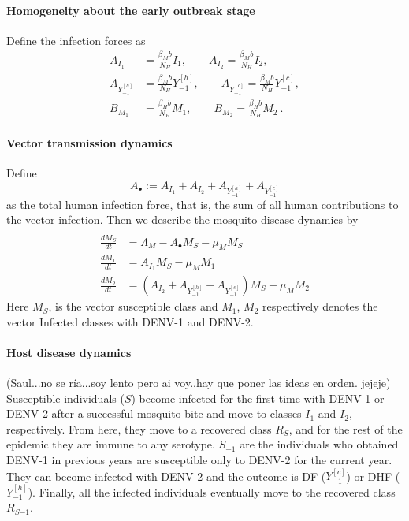 
\paragraph{Homogeneity about the early outbreak stage}

Define the infection forces as
\begin{equation}
	\begin{aligned}
		A_{I_1} &=
			\frac{\beta_Mb}{N_H} I_1, \qquad
		A_{I_2}=
			\frac{\beta_Mb}{N_H} I_2,
	\\
		A_{Y_{-1}^{[h]}}&=
		\frac{\beta_Mb}{N_H} Y_{-1} ^{[h]}, \qquad
		A_{Y_{-1}^{[c]}}=
			\frac{\beta_Mb}{N_H} Y_{-1}^{[c]},
	\\
		B_{M_1} &= 
			\frac{\beta_Hb}{N_H}M_1, \qquad
		B_{M_2}=
			\frac{\beta_Hb}{N_H}M_2 ~.
	\end{aligned}
\end{equation}
\paragraph{Vector transmission dynamics}
Define
$$
	A_{\bullet}:=
		A_{I_1} + A_{I_2} + A_{Y_{-1}^{[h]}} + 
		A_{Y_{-1}^{[c]}}
$$
as the total human infection force, that is, 
the sum of all
human contributions to the vector infection. 
Then we describe the mosquito disease dynamics 
by 
\begin{equation}
	\begin{aligned}
		\\
		\frac{dM_S}{dt}&=
			\Lambda_M
			- A_{\bullet} M_S
			- \mu_M M_S
		\\
		\frac{dM_1}{dt}&=
			A_{I_1}  M_S - \mu_M M_1
		\\
		\frac{dM_2}{dt} &=
			\left(
				A_{I_2}+A_{Y_{-1}^{[h]}}+A_{Y_{-1}^{[c]}}
			\right) 
			M_S-\mu_M M_2
	\end{aligned}
\end{equation}
Here $M_S$, is the vector susceptible class and
$M_1$, $M_2$ respectively denotes the vector 
Infected classes with \ac{DENV-1}
and \ac{DENV-2}.
\paragraph{Host disease dynamics}

(Saul...no se ría...soy lento pero ai voy..hay que poner las ideas en orden. jejeje) Susceptible individuals ($S$) become infected for the first time with DENV-1 or DENV-2 after a successful mosquito bite and move to classes $I_1$ and $I_2$, respectively. From here, they move to a recovered class $R_S$, and for the rest of the epidemic they are immune to any serotype. $S_{-1}$ are the individuals who obtained DENV-1 in previous years are susceptible only to DENV-2 for the current year. They can become infected with DENV-2 and the outcome is DF ($Y_{-1}^{[c]}$) or DHF ($Y_{-1}^{[h]}$). Finally, all the infected individuals eventually move to the recovered class $R_{S{-1}}$.

